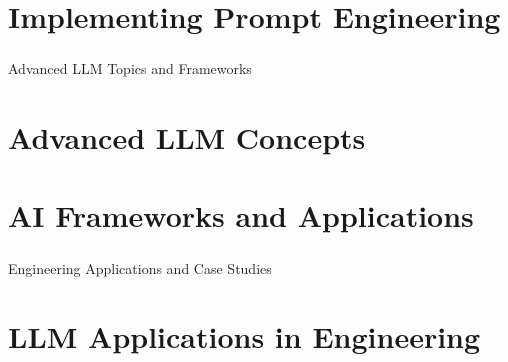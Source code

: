 \section[Day 11 Lab]{Implementing Prompt Engineering}






\begin{frame}[fragile]\frametitle{}
\begin{center}
{\Large Advanced LLM Topics and Frameworks}
\end{center}
\end{frame}

\section[Day 12 Theory]{Advanced LLM Concepts}







\section[Day 12 Lab]{AI Frameworks and Applications}













\begin{frame}[fragile]\frametitle{}
\begin{center}
{\Large Engineering Applications and Case Studies}
\end{center}
\end{frame}

\section[Applications]{LLM Applications in Engineering}









